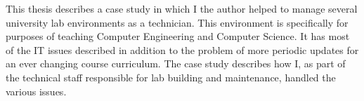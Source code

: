 \vfill\eject

This thesis describes a case study in which I the author helped to manage several university lab environments as a technician.  This environment is specifically for purposes of teaching Computer Engineering and Computer Science.  It has most of the IT issues described in addition to the problem of more periodic updates for an ever changing course curriculum.  The case study describes how I, as part of the technical staff responsible for lab building and maintenance, handled the various issues.
